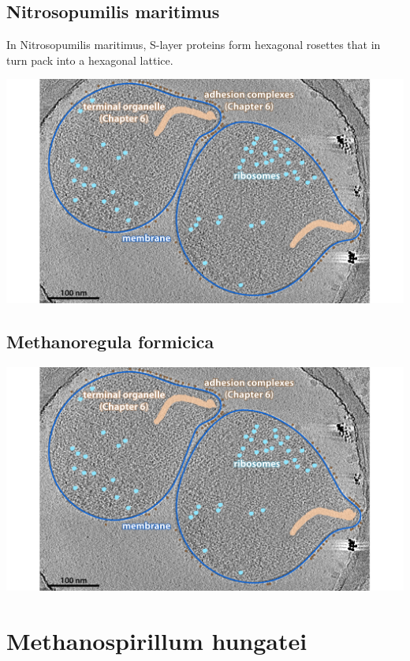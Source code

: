 \documentclass[]{tufte-book}
\begin{document}
\hypertarget{N._maritimus}{\subsection{Nitrosopumilis
maritimus}\label{N._maritimus}}

In Nitrosopumilis maritimus, S-layer proteins form hexagonal rosettes
that in turn pack into a hexagonal lattice.

\includegraphics{img/02_static/2_1_Mgenitalium}

\hypertarget{Methanoregula_formicica}{\subsection{Methanoregula
formicica}\label{Methanoregula_formicica}}

\includegraphics{img/02_static/2_1_Mgenitalium}

\section{Methanospirillum hungatei}\label{methanospirillum-hungatei}
\end{document}
